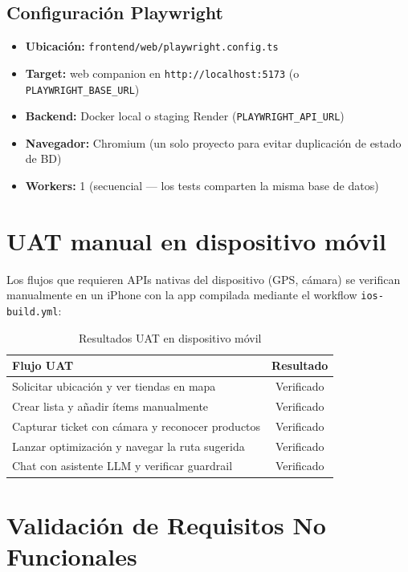 \subsection{Configuraci\'on Playwright}\label{subsec:playwright-config}

\begin{itemize}
  \item \textbf{Ubicaci\'on:} \texttt{frontend/web/playwright.config.ts}
  \item \textbf{Target:} web companion en \texttt{http://localhost:5173} (o
    \texttt{PLAYWRIGHT\_BASE\_URL})
  \item \textbf{Backend:} Docker local o staging Render (\texttt{PLAYWRIGHT\_API\_URL})
  \item \textbf{Navegador:} Chromium (un solo proyecto para evitar duplicaci\'on de estado de BD)
  \item \textbf{Workers:} 1 (secuencial --- los tests comparten la misma base de datos)
\end{itemize}

\section{UAT manual en dispositivo m\'ovil}\label{sec:uat}

Los flujos que requieren APIs nativas del dispositivo (GPS, c\'amara) se verifican manualmente en
un iPhone con la app compilada mediante el workflow \texttt{ios-build.yml}:

\begin{table}[htbp]
\centering
\caption{Resultados UAT en dispositivo m\'ovil}
\label{tab:uat}
\begin{tabular}{@{}lc@{}}
\toprule
\textbf{Flujo UAT} & \textbf{Resultado} \\
\midrule
Solicitar ubicaci\'on y ver tiendas en mapa & Verificado \\
Crear lista y a\~nadir \'items manualmente & Verificado \\
Capturar ticket con c\'amara y reconocer productos & Verificado \\
Lanzar optimizaci\'on y navegar la ruta sugerida & Verificado \\
Chat con asistente LLM y verificar guardrail & Verificado \\
\bottomrule
\end{tabular}
\end{table}

\section{Validaci\'on de Requisitos No Funcionales}\label{sec:nfr}


